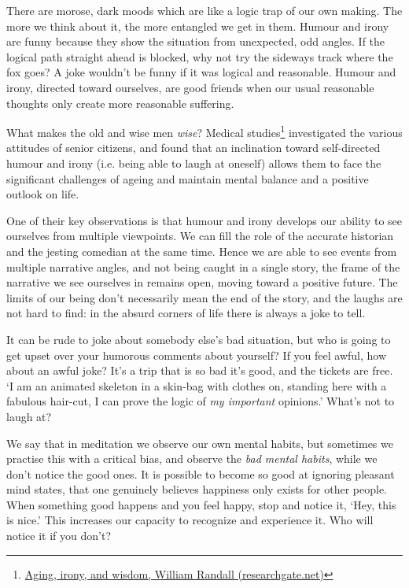 
There are morose, dark moods which are like a logic trap of our own
making. The more we think about it, the more entangled we get in them.
Humour and irony are funny because they show the situation from
unexpected, odd angles. If the logical path straight ahead is blocked,
why not try the sideways track where the fox goes? A joke wouldn't be
funny if it was logical and reasonable. Humour and irony, directed
toward ourselves, are good friends when our usual reasonable thoughts
only create more reasonable suffering.

What makes the old and wise men \emph{wise}? Medical studies\footnote{\href{https://www.researchgate.net/publication/258190619_Aging_irony_and_wisdom_On_the_narrative_psychology_of_later_life}{Aging,
  irony, and wisdom, William Randall (researchgate.net)}} investigated
the various attitudes of senior citizens, and found that an inclination
toward self-directed humour and irony (i.e. being able to laugh at
oneself) allows them to face the significant challenges of ageing and
maintain mental balance and a positive outlook on life.

One of their key observations is that humour and irony develops our
ability to see ourselves from multiple viewpoints. We can fill the role
of the accurate historian and the jesting comedian at the same time.
Hence we are able to see events from multiple narrative angles, and not
being caught in a single story, the frame of the narrative we see
ourselves in remains open, moving toward a positive future. The limits
of our being don't necessarily mean the end of the story, and the laughs
are not hard to find: in the absurd corners of life there is always a
joke to tell.

It can be rude to joke about somebody else's bad situation, but who is
going to get upset over your humorous comments about yourself? If you
feel awful, how about an awful joke? It's a trip that is so bad it's
good, and the tickets are free. `I am an animated skeleton in a skin-bag
with clothes on, standing here with a fabulous hair-cut, I can prove the
logic of \emph{my important} opinions.' What's not to laugh at?

We say that in meditation we observe our own mental habits, but
sometimes we practise this with a critical bias, and observe the
\emph{bad mental habits}, while we don't notice the good ones. It is
possible to become so good at ignoring pleasant mind states, that one
genuinely believes happiness only exists for other people. When
something good happens and you feel happy, stop and notice it, `Hey,
this is nice.' This increases our capacity to recognize and experience
it. Who will notice it if you don't?

